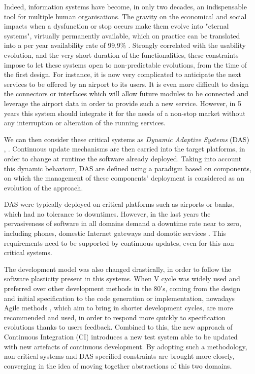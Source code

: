 Indeed, information systems have become, in only two decades, an indispensable tool for multiple human organisations.
The gravity on the economical and social impacts when a dysfunction or stop occurs make them evolve into "eternal systems", virtually permanently available, which on practice can be translated into a per year availability rate of 99,9\%  \cite{van2001metrics}.
Strongly correlated with the usability evolution, and the very short duration of the functionalities, these constraints impose to let these systems open to non-predictable evolutions, from the time of the first design.
For instance, it is now very complicated to anticipate the next services to be offered by an airport to its users.
It is even more difficult to design the connectors or interfaces which will allow future modules to be connected and leverage the airport data in order to provide such a new service.
However, in 5 years this system should integrate it for the needs of a non-stop market without any interruption or alteration of the running services.

We can then consider these critical systems as \textit{Dynamic Adaptive Systems} (DAS) \cite{mckinley2004composing},  \cite{morin2009taming}.
Continuous update mechanisms are then carried into the target platforms, in order to change at runtime the software already deployed.
Taking into account this dynamic behaviour, DAS are defined using a paradigm based on components, on which the management of these components' deployment is considered as an evolution of the approach. %

DAS were typically deployed on critical platforms such as airports or banks, which had no tolerance to downtimes.
However, in the last years the pervasiveness of software in all domains demand a downtime rate near to zero, including phones, domestic Internet gateways and domotic services \cite{nain2008using}.
This requirements need to be supported by continuous updates, even for this non-critical systems.

The development model was also changed drastically, in order to follow the software plasticity present in this systems.
When V cycle was widely used and preferred over other development methods in the 80's, coming from the design and initial specification to the code generation or implementation, nowadays Agile methods \cite{stolberg2009enabling}, which aim to bring in shorter development cycles, are more recommended and used, in order to respond more quickly to specification evolutions thanks to users feedback.
Combined to this, the new approach of Continuous Integration (CI) introduces a new test system able to be updated with new artefacts of continuous development.
By adopting such a methodology, non-critical systems and DAS specified constraints are brought more closely, converging in the idea of moving together abstractions of this two domains.


